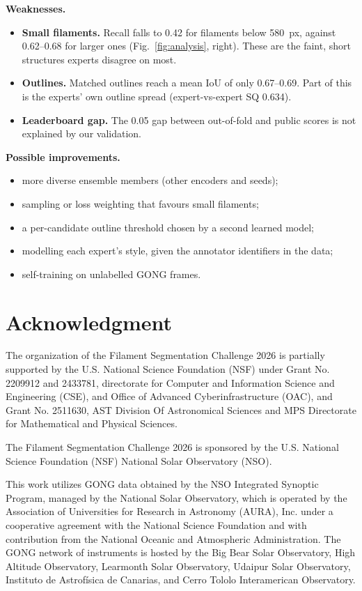 \documentclass[sigconf]{acmart}
\begin{document}
\textbf{Weaknesses.}
\begin{itemize}
    \item \textbf{Small filaments.} Recall falls to 0.42 for filaments below 580~px, against 0.62--0.68 for larger ones (Fig.~\ref{fig:analysis}, right). These are the faint, short structures experts disagree on most.
    \item \textbf{Outlines.} Matched outlines reach a mean IoU of only 0.67--0.69. Part of this is the experts' own outline spread (expert-vs-expert SQ 0.634).
    \item \textbf{Leaderboard gap.} The 0.05 gap between out-of-fold and public scores is not explained by our validation.
\end{itemize}

\textbf{Possible improvements.}
\begin{itemize}
    \item more diverse ensemble members (other encoders and seeds);
    \item sampling or loss weighting that favours small filaments;
    \item a per-candidate outline threshold chosen by a second learned model;
    \item modelling each expert's style, given the annotator identifiers in the data;
    \item self-training on unlabelled GONG frames.
\end{itemize}

\section{Acknowledgment}\label{sec:acknowledgment}
    The organization of the Filament Segmentation Challenge 2026 is partially supported by the U.S. National Science Foundation (NSF) under Grant No. 2209912 and 2433781, directorate for Computer and Information Science and Engineering (CSE), and Office of Advanced Cyberinfrastructure (OAC), and Grant No. 2511630, AST Division Of Astronomical Sciences and MPS Directorate for Mathematical and Physical Sciences.

    The Filament Segmentation Challenge 2026 is sponsored by the U.S. National Science Foundation (NSF) National Solar Observatory (NSO).

    This work utilizes GONG data obtained by the NSO Integrated Synoptic Program, managed by the National Solar Observatory, which is operated by the Association of Universities for Research in Astronomy (AURA), Inc. under a cooperative agreement with the National Science Foundation and with contribution from the National Oceanic and Atmospheric Administration. The GONG network of instruments is hosted by the Big Bear Solar Observatory, High Altitude Observatory, Learmonth Solar Observatory, Udaipur Solar Observatory, Instituto de Astrofísica de Canarias, and Cerro Tololo Interamerican Observatory.



\end{document}
